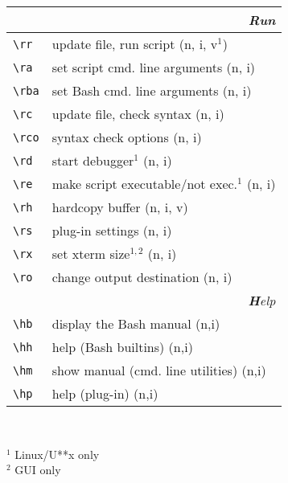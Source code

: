 \documentclass[oneside,11pt,landscape,DIV16]{scrartcl}
\begin{document}
\begin{multicols}{3}
\begin{center}
\begin{tabular}[]{|p{11mm}|p{62mm}|}
\hline
\hline
\multicolumn{2}{|r|}{\textsl{\textbf{R}un}} \\[1.0ex]
\hline \verb'\rr'  & update file, run script              \hfill (n, i, v$^1$)\\
\hline \verb'\ra'  & set script cmd. line arguments       \hfill (n, i)\\
\hline \verb'\rba' & set Bash cmd. line arguments         \hfill (n, i)\\
\hline \verb'\rc'  & update file, check syntax            \hfill (n, i)\\
\hline \verb'\rco' & syntax check options                 \hfill (n, i)\\
\hline \verb'\rd'  & start debugger$^1$                   \hfill (n, i)\\
\hline \verb'\re'  & make script executable/not exec.$^1$ \hfill (n, i)\\
\hline \verb'\rh'  & hardcopy buffer                      \hfill (n, i, v)\\
\hline \verb'\rs'  & plug-in settings                     \hfill (n, i)\\
\hline \verb'\rx'  & set xterm size$^{1,2}$               \hfill (n, i)\\
\hline \verb'\ro'  & change output destination            \hfill (n, i)\\
\hline
\hline 
\multicolumn{2}{|r|}{\textsl{\textbf{H}elp}}\\[1.0ex]
\hline \verb'\hb'   & display the Bash manual           \hfill (n,i)\\
\hline \verb'\hh'   & help (Bash builtins)              \hfill (n,i)\\
\hline \verb'\hm'   & show manual (cmd. line utilities) \hfill (n,i)\\
\hline \verb'\hp'   & help (plug-in)                    \hfill (n,i)\\
\hline 
\end{tabular}\\
%
\vfill
%
\begin{minipage}[b]{75mm}%
\scriptsize{%
\vspace{2mm}
$^1$ {Linux/U**x only}\\
$^2$ {GUI only}
}%
\end{minipage}\\
%
%
\end{center}%
\end{multicols}%
%
\end{document}
